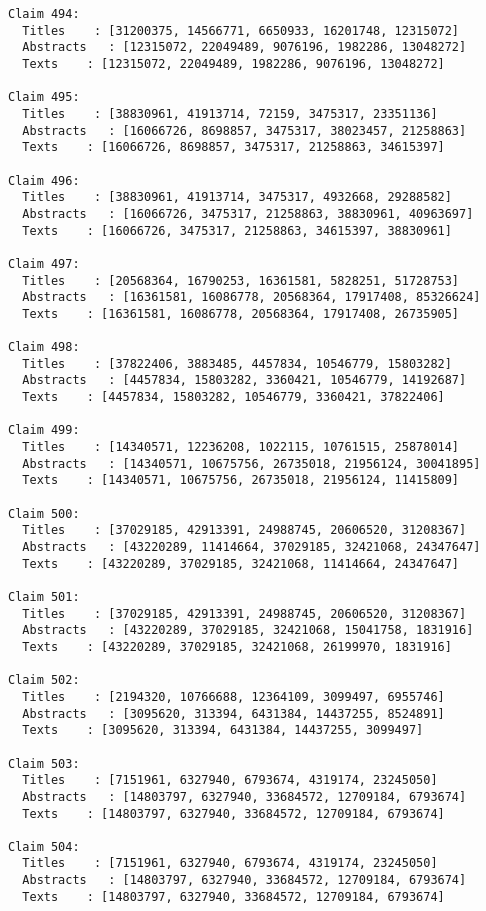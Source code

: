 \documentclass[11pt]{article}
\begin{document}
\begin{Verbatim}[commandchars=\\\{\}]
Claim 494:
  Titles    : [31200375, 14566771, 6650933, 16201748, 12315072]
  Abstracts   : [12315072, 22049489, 9076196, 1982286, 13048272]
  Texts    : [12315072, 22049489, 1982286, 9076196, 13048272]

Claim 495:
  Titles    : [38830961, 41913714, 72159, 3475317, 23351136]
  Abstracts   : [16066726, 8698857, 3475317, 38023457, 21258863]
  Texts    : [16066726, 8698857, 3475317, 21258863, 34615397]

Claim 496:
  Titles    : [38830961, 41913714, 3475317, 4932668, 29288582]
  Abstracts   : [16066726, 3475317, 21258863, 38830961, 40963697]
  Texts    : [16066726, 3475317, 21258863, 34615397, 38830961]

Claim 497:
  Titles    : [20568364, 16790253, 16361581, 5828251, 51728753]
  Abstracts   : [16361581, 16086778, 20568364, 17917408, 85326624]
  Texts    : [16361581, 16086778, 20568364, 17917408, 26735905]

Claim 498:
  Titles    : [37822406, 3883485, 4457834, 10546779, 15803282]
  Abstracts   : [4457834, 15803282, 3360421, 10546779, 14192687]
  Texts    : [4457834, 15803282, 10546779, 3360421, 37822406]

Claim 499:
  Titles    : [14340571, 12236208, 1022115, 10761515, 25878014]
  Abstracts   : [14340571, 10675756, 26735018, 21956124, 30041895]
  Texts    : [14340571, 10675756, 26735018, 21956124, 11415809]

Claim 500:
  Titles    : [37029185, 42913391, 24988745, 20606520, 31208367]
  Abstracts   : [43220289, 11414664, 37029185, 32421068, 24347647]
  Texts    : [43220289, 37029185, 32421068, 11414664, 24347647]

Claim 501:
  Titles    : [37029185, 42913391, 24988745, 20606520, 31208367]
  Abstracts   : [43220289, 37029185, 32421068, 15041758, 1831916]
  Texts    : [43220289, 37029185, 32421068, 26199970, 1831916]

Claim 502:
  Titles    : [2194320, 10766688, 12364109, 3099497, 6955746]
  Abstracts   : [3095620, 313394, 6431384, 14437255, 8524891]
  Texts    : [3095620, 313394, 6431384, 14437255, 3099497]

Claim 503:
  Titles    : [7151961, 6327940, 6793674, 4319174, 23245050]
  Abstracts   : [14803797, 6327940, 33684572, 12709184, 6793674]
  Texts    : [14803797, 6327940, 33684572, 12709184, 6793674]

Claim 504:
  Titles    : [7151961, 6327940, 6793674, 4319174, 23245050]
  Abstracts   : [14803797, 6327940, 33684572, 12709184, 6793674]
  Texts    : [14803797, 6327940, 33684572, 12709184, 6793674]


\end{Verbatim}
\end{document}
